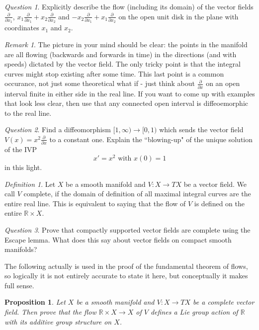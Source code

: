 \documentclass[12pt]{amsart}
\newtheorem{proposition}{Proposition}
\theoremstyle{remark}
\newtheorem{definition}{Definition}
\newtheorem{remark}{Remark}
\newtheorem{question}{Question}
\begin{document}
\begin{question}
Explicitly describe the flow (including its domain) of the vector fields $\frac{\partial}{\partial x_1}$, $x_1\frac{\partial}{\partial x_1}+x_2\frac{\partial}{\partial x_2}$ and $-x_2\frac{\partial}{\partial x_1}+x_1\frac{\partial}{\partial x_2}$ on the open unit disk in the plane with coordinates $x_1$ and $x_2$.
\end{question}
\begin{remark}
The picture in your mind should be clear: the points in the manifold are all flowing (backwards and forwards in time) in the directions (and with speeds) dictated by the vector field. The only tricky point is that the integral curves might stop existing after some time. This last point is a common occurance, not just some theoretical what if - just think about $\frac{\partial}{\partial x}$ on an open interval finite in either side in the real line. If you want to come up with examples that look less clear, then use that any connected open interval is diffeoemorphic to the real line.
\end{remark}
\begin{question}\label{qinfty}
Find a diffeomorphism $[1,\infty)\to [0,1)$ which sends the vector field $V(x)=x^2\frac{\partial}{\partial x}$ to a constant one. Explain the ``blowing-up" of the unique solution of the IVP $$x'=x^2\text{ with } x(0)=1$$ in this light.
\end{question}

\begin{definition}
Let $X$ be a smooth manifold and $V:X\to TX$ be a vector field. We call $V$ complete, if the domain of definition of all maximal integral curves are the entire real line. This is equivalent to saying that the flow of $V$ is defined on the entire $\mathbb{R}\times X$.
\end{definition}

\begin{question}
Prove that compactly supported vector fields are complete using the Escape lemma. What does this say about vector fields on compact smooth manifolds?
\end{question}

The following actually is used in the proof of the fundamental theorem of flows, so logically it is not entirely accurate to state it here, but conceptually it makes full sense. 

\begin{proposition}
Let $X$ be a smooth manifold and $V:X\to TX$ be a complete vector field. Then prove that the flow $\mathbb{R}\times X\to X$ of $V$ defines a Lie group action of $\mathbb{R}$ with its additive group structure on $X$. 
\end{proposition}
\end{document}

